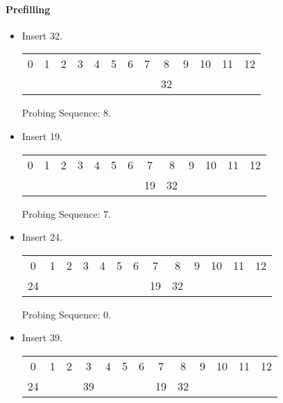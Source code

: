 \documentclass{article}
\begin{document}
\paragraph{Prefilling}

\begin{itemize}
    \item Insert 32.
    
    \begin{center}
        \begin{tabular}{c c c c c c c c c c c c c}
            0 & 1 & 2 & 3 & 4 & 5 & 6 & 7 & 8 & 9 & 10 & 11 & 12 \\
              &   &   &   &   &   &   &   & 32&   &    &    &    \\
        \end{tabular}
    \end{center}

    Probing Sequence: 8.

    \item Insert 19.

    \begin{center}
        \begin{tabular}{c c c c c c c c c c c c c}
            0 & 1 & 2 & 3 & 4 & 5 & 6 & 7 & 8 & 9 & 10 & 11 & 12 \\
              &   &   &   &   &   &   & 19& 32&   &    &    &    \\
        \end{tabular}
    \end{center}

    Probing Sequence: 7.

    \item Insert 24.

    \begin{center}
        \begin{tabular}{c c c c c c c c c c c c c}
            0 & 1 & 2 & 3 & 4 & 5 & 6 & 7 & 8 & 9 & 10 & 11 & 12 \\
            24&   &   &   &   &   &   & 19& 32&   &    &    &    \\
        \end{tabular}
    \end{center}

    Probing Sequence: 0.

    \item Insert 39.

    \begin{center}
        \begin{tabular}{c c c c c c c c c c c c c}
            0 & 1 & 2 & 3 & 4 & 5 & 6 & 7 & 8 & 9 & 10 & 11 & 12 \\
            24&   &   & 39&   &   &   & 19& 32&   &    &    &    \\
        \end{tabular}
    \end{center}


\end{itemize}
\end{document}
